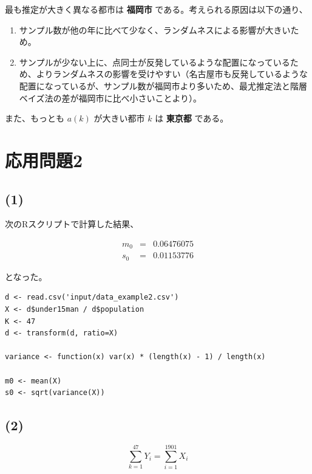 \documentclass[a4j,xelatex,ja=standard,jafont=hiragino-pron, 9pt]{bxjsarticle}
\def\tightlist{\itemsep1pt\parskip0pt\parsep0pt}
\begin{document}
最も推定が大きく異なる都市は \textbf{福岡市}
である。考えられる原因は以下の通り、

\begin{enumerate}
\def\labelenumi{\arabic{enumi}.}
\tightlist
\item
  サンプル数が他の年に比べて少なく、ランダムネスによる影響が大きいため。
\item
  サンプルが少ない上に、点同士が反発しているような配置になっているため、よりランダムネスの影響を受けやすい（名古屋市も反発しているような配置になっているが、サンプル数が福岡市より多いため、最尤推定法と階層ベイズ法の差が福岡市に比べ小さいことより）。
\end{enumerate}

また、もっとも \(a(k)\) が大きい都市 \(k\) は \textbf{東京都} である。

\section*{応用問題2}

\subsection*{(1)}

次のRスクリプトで計算した結果、

\begin{eqnarray}
    m_0 &=& 0.06476075  \\
    s_0 &=& 0.01153776
\end{eqnarray}

となった。

\begin{lstlisting}
d <- read.csv('input/data_example2.csv')
X <- d$under15man / d$population
K <- 47
d <- transform(d, ratio=X)

variance <- function(x) var(x) * (length(x) - 1) / length(x)

m0 <- mean(X)
s0 <- sqrt(variance(X))
\end{lstlisting}

\subsection*{(2)}

\begin{equation}
\sum_{k=1}^{47} Y_i = \sum_{i=1}^{1901} X_i
\end{equation}
\end{document}
